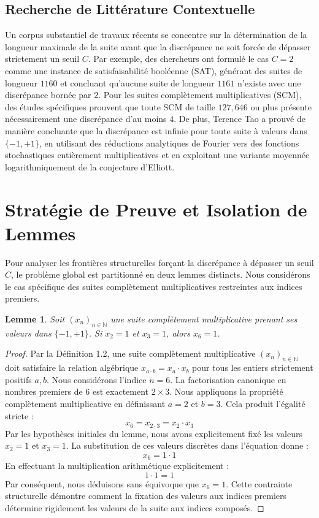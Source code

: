 \documentclass[12pt, a4paper]{article}
\newtheorem{lemma}[theorem]{Lemme}
\begin{document}
\subsection{Recherche de Litt\'erature Contextuelle}
Un corpus substantiel de travaux r\'ecents se concentre sur la d\'etermination de la longueur maximale de la suite avant que la discr\'epance ne soit forc\'ee de d\'epasser strictement un seuil $C$. Par exemple, des chercheurs ont formul\'e le cas $C=2$ comme une instance de satisfaisabilit\'e bool\'eenne (SAT), g\'en\'erant des suites de longueur $1160$ et concluant qu'aucune suite de longueur $1161$ n'existe avec une discr\'epance born\'ee par $2$. Pour les suites compl\`etement multiplicatives (SCM), des \'etudes sp\'ecifiques prouvent que toute SCM de taille $127,646$ ou plus pr\'esente n\'ecessairement une discr\'epance d'au moins $4$. De plus, Terence Tao a prouv\'e de mani\`ere concluante que la discr\'epance est infinie pour toute suite \`a valeurs dans $\{-1, +1\}$, en utilisant des r\'eductions analytiques de Fourier vers des fonctions stochastiques enti\`erement multiplicatives et en exploitant une variante moyenn\'ee logarithmiquement de la conjecture d'Elliott.

\section{Strat\'egie de Preuve et Isolation de Lemmes}
Pour analyser les fronti\`eres structurelles for\c{c}ant la discr\'epance \`a d\'epasser un seuil $C$, le probl\`eme global est partitionn\'e en deux lemmes distincts. Nous consid\'erons le cas sp\'ecifique des suites compl\`etement multiplicatives restreintes aux indices premiers.

\begin{lemma}
Soit $(x_n)_{n \in \mathbb{N}}$ une suite compl\`etement multiplicative prenant ses valeurs dans $\{-1, +1\}$. Si $x_2 = 1$ et $x_3 = 1$, alors $x_6 = 1$.
\end{lemma}
\begin{proof}
Par la D\'efinition 1.2, une suite compl\`etement multiplicative $(x_n)_{n \in \mathbb{N}}$ doit satisfaire la relation alg\'ebrique $x_{a \cdot b} = x_a \cdot x_b$ pour tous les entiers strictement positifs $a, b$.
Nous consid\'erons l'indice $n = 6$. La factorisation canonique en nombres premiers de $6$ est exactement $2 \times 3$.
Nous appliquons la propri\'et\'e compl\`etement multiplicative en d\'efinissant $a = 2$ et $b = 3$.
Cela produit l'\'egalit\'e stricte :
\[ x_6 = x_{2 \cdot 3} = x_2 \cdot x_3 \]
Par les hypoth\`eses initiales du lemme, nous avons explicitement fix\'e les valeurs $x_2 = 1$ et $x_3 = 1$.
La substitution de ces valeurs discr\`etes dans l'\'equation donne :
\[ x_6 = 1 \cdot 1 \]
En effectuant la multiplication arithm\'etique explicitement :
\[ 1 \cdot 1 = 1 \]
Par cons\'equent, nous d\'eduisons sans \'equivoque que $x_6 = 1$. Cette contrainte structurelle d\'emontre comment la fixation des valeurs aux indices premiers d\'etermine rigidement les valeurs de la suite aux indices compos\'es.
\end{proof}
\end{document}
